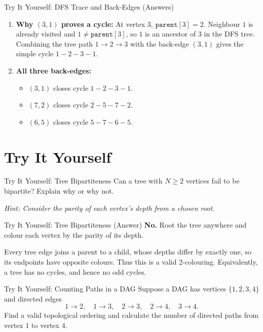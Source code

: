 \documentclass{beamer}
\begin{document}
\begin{frame}{Try It Yourself: DFS Trace and Back-Edges (Answers)}
  \begin{enumerate}
    \item \textbf{Why $(3, 1)$ proves a cycle:} At vertex $3$, $\texttt{parent}[3] = 2$. Neighbour $1$ is already visited and $1 \neq \texttt{parent}[3]$, so $1$ is an ancestor of $3$ in the DFS tree. Combining the tree path $1 \to 2 \to 3$ with the back-edge $(3, 1)$ gives the simple cycle $1 - 2 - 3 - 1$.
    \item \textbf{All three back-edges:}
      \begin{itemize}
        \item $(3, 1)$ closes cycle $1 - 2 - 3 - 1$.
        \item $(7, 2)$ closes cycle $2 - 5 - 7 - 2$.
        \item $(6, 5)$ closes cycle $5 - 7 - 6 - 5$.
      \end{itemize}
  \end{enumerate}
\end{frame}

\section{Try It Yourself}

\begin{frame}{Try It Yourself: Tree Bipartiteness}
  Can a tree with $N \ge 2$ vertices fail to be bipartite? Explain why or why not.

  \vspace{0.8em}
  \emph{Hint: Consider the parity of each vertex's depth from a chosen root.}
\end{frame}

\begin{frame}{Try It Yourself: Tree Bipartiteness (Answer)}
  \textbf{No.} Root the tree anywhere and colour each vertex by the parity of its depth.

  Every tree edge joins a parent to a child, whose depths differ by exactly one, so its endpoints have opposite colours. Thus this is a valid 2-colouring. Equivalently, a tree has no cycles, and hence no odd cycles.
\end{frame}

\begin{frame}{Try It Yourself: Counting Paths in a DAG}
  Suppose a DAG has vertices $\{1,2,3,4\}$ and directed edges
  \[1 \to 2,\quad 1 \to 3,\quad 2 \to 3,\quad 2 \to 4,\quad 3 \to 4.\]
  Find a valid topological ordering and calculate the number of directed paths from vertex $1$ to vertex $4$.
\end{frame}
\end{document}
